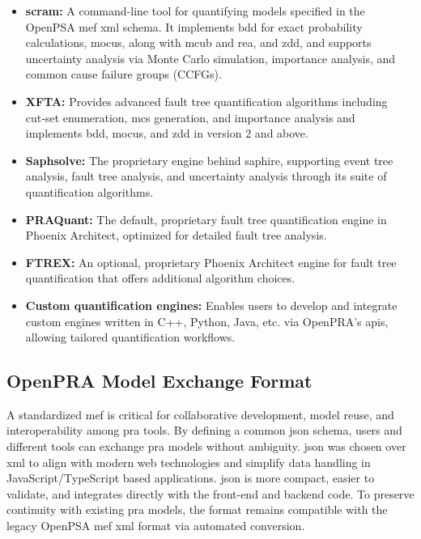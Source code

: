 \begin{itemize}
  \item \textbf{scram:} A command‑line tool for quantifying models specified in the OpenPSA \acrshort{mef} \acrshort{xml} schema. It implements \acrshort{bdd} for exact probability calculations, \acrshort{mocus}, along with \acrshort{mcub} and \acrshort{rea}, and \acrshort{zdd}, and supports uncertainty analysis via Monte Carlo simulation, importance analysis, and common cause failure groups (CCFGs).
  \item \textbf{XFTA:} Provides advanced fault tree quantification algorithms including cut‑set enumeration, \acrshort{mcs} generation, and importance analysis and implements \acrshort{bdd}, \acrshort{mocus}, and \acrshort{zdd} in version 2 and above.
  \item \textbf{Saphsolve:} The proprietary engine behind \acrshort{saphire}, supporting event tree analysis, fault tree analysis, and uncertainty analysis through its suite of quantification algorithms.
  \item \textbf{PRAQuant:} The default, proprietary fault tree quantification engine in Phoenix Architect, optimized for detailed fault tree analysis.
  \item \textbf{FTREX:} An optional, proprietary Phoenix Architect engine for fault tree quantification that offers additional algorithm choices.
  \item \textbf{Custom quantification engines:} Enables users to develop and integrate custom engines written in C++, Python, Java, etc. via OpenPRA’s \acrfull{api}s, allowing tailored quantification workflows.
\end{itemize}



\subsection{OpenPRA Model Exchange Format}

A standardized \acrfull{mef} is critical for collaborative development, model reuse, and interoperability among \acrshort{pra} tools.  By defining a common \acrshort{json} schema, users and different tools can exchange \acrshort{pra} models without ambiguity.  \acrshort{json} was chosen over \acrshort{xml} to align with modern web technologies and simplify data handling in JavaScript/TypeScript based applications. \acrshort{json} is more compact, easier to validate, and integrates directly with the front-end and backend code.  To preserve continuity with existing \acrshort{pra} models, the format remains compatible with the legacy OpenPSA \acrshort{mef} \acrshort{xml} format via automated conversion.

